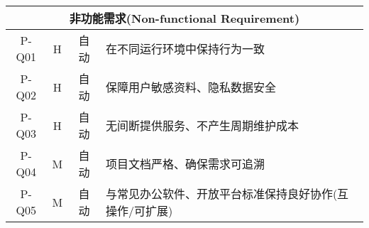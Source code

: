 \begin{longtable}{|c|c|c|X|}
  \multicolumn{4}{|c|}{非功能需求(Non-functional Requirement)} \\ \hline
  P-Q01   & H & 自动 & 在不同运行环境中保持行为一致 \\ \hline
  P-Q02   & H & 自动 & 保障用户敏感资料、隐私数据安全 \\ \hline
  P-Q03   & H & 自动 & 无间断提供服务、不产生周期维护成本 \\ \hline
  P-Q04   & M & 自动 & 项目文档严格、确保需求可追溯 \\ \hline
  P-Q05   & M & 自动 & 与常见办公软件、开放平台标准保持良好协作(互操作/可扩展) \\ \hline

\end{longtable}

